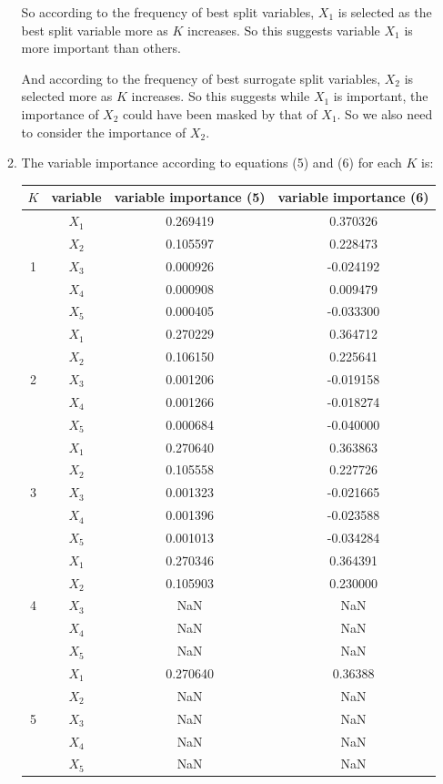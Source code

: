 \documentclass[paper=letter, fontsize=12pt]{article}
\begin{document}
\begin{enumerate}[label=(\alph*)]
\begin{enumerate}[label=(\roman*)]
		So according to the frequency of best split variables, $X_1$ is selected as the best split variable more as $K$ increases. So this suggests variable $X_1$ is more important than others.
		
		And according to the frequency of best surrogate split variables, $X_2$ is selected more as $K$ increases. So this suggests while $X_1$ is important, the importance of $X_2$ could have been masked by that of $X_1$. So we also need to consider the importance of $X_2$.
		
		\item The variable importance according to equations (5) and (6) for each $K$ is:
		
		\begin{longtable}{|c|c|c|c|}
			\hline
			$K$ & variable & variable importance (5) & variable importance (6) \\ \hline
			\multirow{5}{1em}{1} & $X_1$ & 0.269419 & 0.370326 \\ 
			& $X_2$ & 0.105597 & 0.228473 \\
			& $X_3$ & 0.000926 & -0.024192 \\
			& $X_4$ & 0.000908 & 0.009479 \\
			& $X_5$ & 0.000405 & -0.033300 \\
			\hline
			\multirow{5}{1em}{2} & $X_1$ & 0.270229 & 0.364712 \\ 
			& $X_2$ & 0.106150 & 0.225641 \\
			& $X_3$ & 0.001206 & -0.019158 \\
			& $X_4$ & 0.001266 & -0.018274 \\
			& $X_5$ & 0.000684 & -0.040000 \\
			\hline
			\multirow{5}{1em}{3} & $X_1$ & 0.270640 & 0.363863 \\ 
			& $X_2$ & 0.105558 & 0.227726 \\
			& $X_3$ & 0.001323 & -0.021665 \\
			& $X_4$ & 0.001396 & -0.023588 \\
			& $X_5$ & 0.001013 & -0.034284 \\
			\hline
			\multirow{5}{1em}{4} & $X_1$ & 0.270346 & 0.364391 \\ 
			& $X_2$ & 0.105903 & 0.230000 \\
			& $X_3$ & NaN & NaN \\
			& $X_4$ & NaN & NaN \\
			& $X_5$ & NaN & NaN \\
			\hline
			\multirow{5}{1em}{5} & $X_1$ & 0.270640 & 0.36388 \\ 
			& $X_2$ & NaN & NaN \\
			& $X_3$ & NaN & NaN \\
			& $X_4$ & NaN & NaN \\
			& $X_5$ & NaN & NaN \\
			\hline
		\end{longtable}
	

\end{enumerate}
\end{enumerate}
\end{document}
